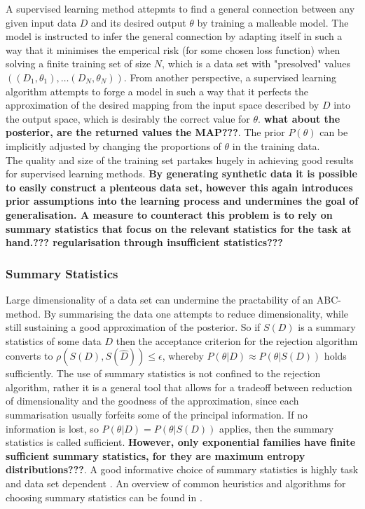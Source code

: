\documentclass[a4paper, 11pt]{article}
\begin{document}
A supervised learning method attepmts to find a general connection between any given input data $D$ and its desired output $\theta$ by training a malleable model. The model is instructed to infer the general connection by adapting itself in such a way that it minimises the emperical risk (for some chosen loss function) when solving a finite training set of size $N$, which is a data set with "presolved" values $((D_1,\theta_1),\ldots (D_N,\theta_N))$. From another perspective, a supervised learning algorithm attempts to forge a model in such a way that it perfects the approximation of the desired mapping from the input space described by $D$ into the output space, which is desirably the correct value for $\theta$. \textbf{what about the posterior, are the returned values the MAP???}. The prior $P(\theta)$ can be implicitly adjusted by changing the proportions of $\theta$ in the training data.\\
The quality and size of the training set partakes hugely in achieving good results for supervised learning methods. \textbf{By generating synthetic data it is possible to easily construct a plenteous data set, however this again introduces prior assumptions into the learning process and undermines the goal of generalisation. A measure to counteract this problem is to rely on summary statistics that focus on the relevant statistics for the task at hand.??? regularisation through insufficient statistics???}

\subsubsection{Summary Statistics}
Large dimensionality of a data set can undermine the practability of an ABC-method. By summarising the data one attempts to reduce dimensionality, while still sustaining a good approximation of the posterior. So if $S(D)$ is a summary statistics of some data $D$ then the acceptance criterion for the rejection algorithm converts to $\rho(S(D), S(\hat{D})) \leq \epsilon$, whereby $P(\theta|D) \approx P(\theta|S(D))$ holds sufficiently. The use of summary statistics is not confined to the rejection algorithm, rather it is a general tool that allows for a tradeoff between reduction of dimensionality and the goodness of the approximation, since each summarisation usually forfeits some of the principal information. If no information is lost, so $P(\theta | D) = P(\theta| S(D))$ applies, then the summary statistics is called sufficient. \textbf{However, only exponential families have finite sufficient summary statistics, for they are maximum entropy distributions???}. A good informative choice of summary statistics is highly task and data set dependent \cite{nunes2010optimal}. An overview of common heuristics and algorithms for choosing summary statistics can be found in \cite{blum2013comparative}.
\end{document}
